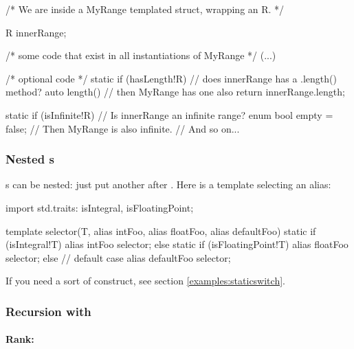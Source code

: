\begin{dcode}
/* We are inside a MyRange templated struct, wrapping an R. */

    R innerRange;

/* some code that exist in all instantiations of MyRange */
(...)

/* optional code */
static if (hasLength!R) // does innerRange has a .length() method?
    auto length()       // then MyRange has one also
    {
        return innerRange.length;
    }

static if (isInfinite!R)     // Is innerRange an infinite range?
    enum bool empty = false; // Then MyRange is also infinite.
// And so on...
\end{dcode}

\subsubsection{\texorpdfstring{Nested s}
                              {Nested static ifs}}

s can be nested: just put another  after . Here is a template selecting an alias:

\begin{dcode}
import std.traits: isIntegral, isFloatingPoint;

template selector(T, alias intFoo, alias floatFoo, alias defaultFoo)
{
    static if (isIntegral!T)
       alias intFoo selector;
    else static if (isFloatingPoint!T)
       alias floatFoo selector; 
    else // default case
        alias defaultFoo selector;
}
\end{dcode}

If you need a sort of  construct, see section \ref{examples:staticswitch}.

\subsubsection{\texorpdfstring{Recursion with }
                              {Recursion with static if}}
\label{staticifrecursion}

\paragraph{Rank:}\label{rank}

